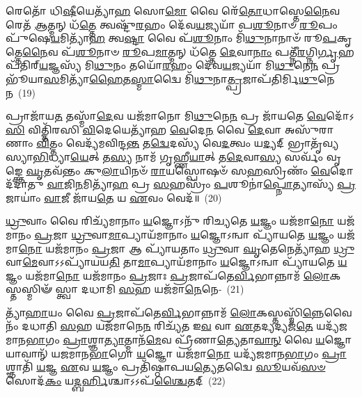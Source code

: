 𑌰𑍇𑌤𑍋᳴ 𑌧𑌿\-\ul{𑌷𑍀}\-𑌯𑍇𑌤𑍍𑌯𑌾᳴\-\ul{𑌹} 𑌸𑍋\-\ul{𑌮𑍋} 𑌵𑍈 𑌰𑍇᳴\-\ul{𑌤𑍋}\-𑌧𑌾𑌸𑍍𑌤𑍇\-\ul{𑌨𑍈}\-𑌵 𑌰𑍇𑌤᳴ \ul{𑌆}\-𑌤𑍍𑌮𑌨𑍍 𑌧᳴\-\ul{𑌤𑍍𑌤𑍇} 𑌤𑍍𑌵𑌷𑍍𑌟𑍁᳴\-\ul{𑌰}\-𑌹𑌂 𑌦𑍇᳴𑌵\-\ul{𑌯}\-𑌜𑍍𑌯𑌯𑌾᳴ 𑌪\-\ul{𑌶𑍂}\-𑌨𑌾𑍞 \ul{𑌰𑍂}\-𑌪𑌂 𑌪𑍁᳴𑌷𑍇\-\ul{𑌯}\-𑌮𑌿𑌤𑍍𑌯𑌾᳴\-\ul{𑌹} 𑌤𑍍𑌵\-\ul{𑌷𑍍𑌟𑌾} 𑌵𑍈 𑌪᳴\-\ul{𑌶𑍂}\-𑌨𑌾𑌂 𑌮𑌿᳴\-\ul{𑌥𑍁}\-𑌨𑌾𑌨𑌾𑍞᳴ 𑌰𑍂\-\ul{𑌪}\-𑌕𑍃𑌤𑍍𑌤𑍇\-\ul{𑌨𑍈}\-𑌵 𑌪᳴\-\ul{𑌶𑍂}\-𑌨𑌾𑍞 \ul{𑌰𑍂}\-𑌪\-\ul{𑌮𑌾}\-𑌤𑍍𑌮𑌨𑍍 𑌧᳴𑌤𑍍𑌤𑍇 \ul{𑌦𑍇}\-𑌵𑌾\-\ul{𑌨𑌾𑌂} 𑌪𑌤𑍍𑌨𑍀᳴\-\ul{𑌰}\-𑌗𑍍𑌨𑌿\-\ul{𑌰𑍍𑌗𑍃}\-𑌹𑌪᳴𑌤𑌿𑌰𑍍‌\-\ul{𑌯}\-𑌜𑍍𑌞𑌸𑍍𑌯᳴ 𑌮𑌿\-\ul{𑌥𑍁}\-𑌨𑌂 𑌤𑌯𑍋᳴\-\ul{𑌰}\-𑌹𑌂 𑌦𑍇᳴𑌵\-\ul{𑌯}\-𑌜𑍍𑌯𑌯𑌾᳴ 𑌮𑌿\-\ul{𑌥𑍁}\-𑌨𑍇\-\ul{𑌨} 𑌪𑍍𑌰 𑌭𑍂᳴𑌯𑌾\-\ul{𑌸}\-𑌮𑌿𑌤𑍍𑌯𑌾᳴\-\ul{𑌹𑍈}\-𑌤\-\ul{𑌸𑍍𑌮𑌾}\-𑌦𑍍𑌵𑍈 𑌮𑌿᳴\-\ul{𑌥𑍁}\-𑌨𑌾\-\ul{𑌤𑍍𑌪𑍍𑌰}\-𑌜𑌾𑌪᳴𑌤𑌿𑌰𑍍𑌮𑌿\-\ul{𑌥𑍁}\-𑌨𑍇\-\ul{𑌨}\-~(19)

𑌪𑍍𑌰𑌾𑌜𑌾᳴𑌯\-\ul{𑌤} 𑌤𑌸𑍍𑌮𑌾᳴\-\ul{𑌦𑍇}\-𑌵 𑌯𑌜᳴𑌮𑌾𑌨𑍋 𑌮𑌿\-\ul{𑌥𑍁}\-𑌨𑍇\-\ul{𑌨} 𑌪𑍍𑌰 𑌜𑌾᳴𑌯𑌤𑍇 \ul{𑌵𑍇}\-𑌦𑍋᳴\-𑌽\-\ul{𑌸𑌿} 𑌵𑌿𑌤𑍍𑌤𑌿᳴𑌰𑌸𑌿 \ul{𑌵𑌿}\-𑌦𑍇𑌯𑍇𑌤𑍍𑌯𑌾᳴𑌹 \ul{𑌵𑍇}\-𑌦𑍇\-\ul{𑌨} 𑌵𑍈 \ul{𑌦𑍇}\-𑌵𑌾 𑌅𑌸𑍁᳴𑌰𑌾𑌣𑌾𑌂 \ul{𑌵𑌿}\-𑌤𑍍𑌤𑌂 𑌵𑍇𑌦𑍍𑌯᳴𑌮𑌵𑌿𑌨𑍍𑌦\-\ul{𑌨𑍍𑌤} 𑌤\-\ul{𑌦𑍍𑌵𑍇}\-𑌦𑌸𑍍𑌯᳴ 𑌵𑍇\-\ul{𑌦}\-𑌤𑍍𑌵𑌂 𑌯\-\ul{𑌦𑍍𑌯}\-𑌦𑍍 𑌭𑍍𑌰𑌾𑌤𑍃᳴𑌵𑍍𑌯𑌸𑍍𑌯𑌾\-\ul{𑌭𑌿}\-𑌧𑍍𑌯𑌾\-\ul{𑌯𑍇}\-𑌤𑍍 𑌤\-\ul{𑌸𑍍𑌯} 𑌨𑌾𑌮᳴ 𑌗𑍃𑌹𑍍𑌣𑍀\-\ul{𑌯𑌾}\-𑌤𑍍 𑌤\-\ul{𑌦𑍇}\-𑌵𑌾\-\ul{𑌸𑍍𑌯} 𑌸𑌰𑍍𑌵𑌂᳴ 𑌵𑍃𑌙𑍍𑌕𑍍𑌤𑍇 \ul{𑌘𑍃}\-𑌤𑌵᳴𑌨𑍍𑌤𑌂 𑌕𑍁\-\ul{𑌲𑌾}\-𑌯𑌿𑌨𑍞᳴ \ul{𑌰𑌾}\-𑌯𑌸𑍍𑌪𑍋𑌷𑍞᳴ 𑌸\-\ul{𑌹}\-𑌸𑍍𑌰𑌿𑌣𑌂᳴ \ul{𑌵𑍇}\-𑌦𑍋 𑌦᳴𑌦𑌾𑌤𑍁 \ul{𑌵𑌾}\-𑌜𑌿\-\ul{𑌨}\-𑌮𑌿𑌤𑍍𑌯𑌾᳴\-\ul{𑌹} 𑌪𑍍𑌰 \ul{𑌸}\-𑌹𑌸𑍍𑌰𑌂᳴ \ul{𑌪}\-𑌶𑍂𑌨𑌾॑\-\ul{𑌪𑍍𑌨𑍋}\-𑌤𑍍𑌯𑌾𑌸𑍍𑌯᳴ \ul{𑌪𑍍𑌰}\-𑌜𑌾𑌯𑌾𑌂॑ \ul{𑌵𑌾}\-𑌜𑍀 𑌜𑌾᳴𑌯\-\ul{𑌤𑍇} 𑌯 \ul{𑌏}\-𑌵𑌂 𑌵𑍇𑌦᳴॥~(20)

{\anuvakamend[{\-\ul{𑌦}\-\-\ul{𑌰𑍍}\-\mbox{}\-\ul{𑌶}\-\-\ul{𑌪𑍂}\-\-\ul{𑌰𑍍𑌣}\-\-\ul{𑌮𑌾}\-𑌸𑌯𑍋᳴𑌰𑍁\-\ul{𑌭}\-𑌯𑌤𑍋᳴ 𑌦𑍇\-\ul{𑌵𑌾}\-𑌶𑍍𑌵𑌾𑌃 \ul{𑌸𑍁}\-𑌰𑍇𑌤𑌾𑌃॑ \ul{𑌪𑍍𑌰}\-𑌜𑌾𑌪᳴𑌤𑌿𑌰𑍍𑌮𑌿\-\ul{𑌥𑍁}\-𑌨𑍇𑌨𑌾॑\-𑌽\-𑌽𑌪𑍍𑌨𑍋\-\ul{𑌤𑍍𑌯}\-𑌷𑍍𑌟𑍗 𑌚᳴}]}%

\-\ul{𑌧𑍍𑌰𑍁}\-𑌵𑌾𑌂 𑌵𑍈 𑌰𑌿𑌚𑍍𑌯᳴𑌮𑌾𑌨𑌾𑌂 \ul{𑌯}\-𑌜𑍍𑌞𑍋\-𑌽𑌨𑍁᳴ 𑌰𑌿𑌚𑍍𑌯𑌤𑍇 \ul{𑌯}\-𑌜𑍍𑌞𑌂 𑌯𑌜᳴𑌮𑌾\-\ul{𑌨𑍋} 𑌯𑌜᳴𑌮𑌾𑌨𑌂 \ul{𑌪𑍍𑌰}\-𑌜𑌾 \ul{𑌧𑍍𑌰𑍁}\-𑌵𑌾\-\ul{𑌮𑌾}\-𑌪𑍍𑌯𑌾𑌯᳴𑌮𑌾𑌨𑌾𑌂 \ul{𑌯}\-𑌜𑍍𑌞𑍋\-𑌽𑌨𑍍𑌵𑌾 𑌪𑍍𑌯𑌾᳴𑌯𑌤𑍇 \ul{𑌯}\-𑌜𑍍𑌞𑌂 𑌯𑌜᳴𑌮𑌾\-\ul{𑌨𑍋} 𑌯𑌜᳴𑌮𑌾𑌨𑌂 \ul{𑌪𑍍𑌰}\-𑌜𑌾 𑌆 𑌪𑍍𑌯𑌾᳴𑌯𑌤𑌾𑌂 \ul{𑌧𑍍𑌰𑍁}\-𑌵𑌾 \ul{𑌘𑍃}\-𑌤𑍇𑌨𑍇𑌤𑍍𑌯𑌾᳴𑌹 \ul{𑌧𑍍𑌰𑍁}\-𑌵𑌾\-\ul{𑌮𑍇}\-𑌵𑌾\-𑌽\-𑌽𑌪𑍍𑌯𑌾᳴𑌯𑌯\-\ul{𑌤𑌿} 𑌤𑌾\-\ul{𑌮𑌾}\-𑌪𑍍𑌯𑌾𑌯᳴𑌮𑌾𑌨𑌾𑌂 \ul{𑌯}\-𑌜𑍍𑌞𑍋\-𑌽𑌨𑍍𑌵𑌾 𑌪𑍍𑌯𑌾᳴𑌯𑌤𑍇 \ul{𑌯}\-𑌜𑍍𑌞𑌂 𑌯𑌜᳴𑌮𑌾\-\ul{𑌨𑍋} 𑌯𑌜᳴𑌮𑌾𑌨𑌂 \ul{𑌪𑍍𑌰}\-𑌜𑌾𑌃 \ul{𑌪𑍍𑌰}\-𑌜𑌾𑌪᳴𑌤𑍇\-\ul{𑌰𑍍𑌵𑌿}\-𑌭𑌾𑌨𑍍𑌨𑌾𑌮᳴ \ul{𑌲𑍋}\-𑌕𑌸𑍍𑌤𑌸𑍍𑌮𑌿𑍟᳴ 𑌸𑍍𑌤𑍍𑌵𑌾 𑌦𑌧𑌾𑌮𑌿 \ul{𑌸}\-𑌹 𑌯𑌜᳴𑌮𑌾\-\ul{𑌨𑍇}\-𑌨𑍇-~(21)

𑌤𑍍𑌯𑌾᳴\-\ul{𑌹𑌾}\-𑌯𑌂 𑌵𑍈 \ul{𑌪𑍍𑌰}\-𑌜𑌾𑌪᳴𑌤𑍇\-\ul{𑌰𑍍𑌵𑌿}\-𑌭𑌾𑌨𑍍𑌨𑌾𑌮᳴ \ul{𑌲𑍋}\-𑌕𑌸𑍍𑌤𑌸𑍍𑌮𑌿᳴\-\ul{𑌨𑍍𑌨𑍇}\-𑌵𑍈𑌨𑌂᳴ 𑌦𑌧𑌾𑌤𑌿 \ul{𑌸}\-𑌹 𑌯𑌜᳴𑌮𑌾𑌨𑍇\-\ul{𑌨} 𑌰𑌿𑌚𑍍𑌯᳴𑌤 𑌇\-\ul{𑌵} 𑌵𑌾 \ul{𑌏}\-𑌤𑌦𑍍𑌯𑌦𑍍𑌯𑌜᳴\-\ul{𑌤𑍇} 𑌯𑌦𑍍𑌯᳴𑌜𑌮𑌾𑌨\-\ul{𑌭𑌾}\-𑌗𑌂 \ul{𑌪𑍍𑌰𑌾}\-𑌶𑍍𑌞𑌾\-\ul{𑌤𑍍𑌯𑌾}\-𑌤𑍍𑌮𑌾𑌨᳴\-\ul{𑌮𑍇}\-𑌵 𑌪𑍍𑌰𑍀᳴𑌣𑌾\-\ul{𑌤𑍍𑌯𑍇}\-𑌤𑌾\-\ul{𑌵𑌾}\-\-\ul{𑌨𑍍} 𑌵𑍈 \ul{𑌯}\-𑌜𑍍𑌞𑍋 𑌯𑌾𑌵𑌾𑌨𑍍᳴ 𑌯𑌜𑌮𑌾𑌨\-\ul{𑌭𑌾}\-𑌗𑍋 \ul{𑌯}\-𑌜𑍍𑌞𑍋 𑌯𑌜᳴𑌮𑌾\-\ul{𑌨𑍋} 𑌯𑌦𑍍𑌯᳴𑌜𑌮𑌾𑌨\-\ul{𑌭𑌾}\-𑌗𑌂 \ul{𑌪𑍍𑌰𑌾}\-𑌶𑍍𑌞𑌾𑌤𑌿᳴ \ul{𑌯}\-𑌜𑍍𑌞 \ul{𑌏}\-𑌵 \ul{𑌯}\-𑌜𑍍𑌞𑌂 𑌪𑍍𑌰𑌤𑌿᳴𑌷𑍍𑌠𑌾𑌪𑌯\-\ul{𑌤𑍍𑌯𑍇}\-𑌤𑌦𑍍𑌵𑍈 \ul{𑌸𑍂}\-𑌯𑌵᳴\-\ul{𑌸}\-\-\ul{𑍞} 𑌸𑍋𑌦᳴\-\ul{𑌕𑌂} 𑌯\-\ul{𑌦𑍍𑌬}\-\-\ul{𑌰𑍍}\-\mbox{}𑌹𑌿𑌶𑍍𑌚𑌾\-𑌽\-𑌽𑌪᳴\-\ul{𑌶𑍍𑌚𑍈}\-𑌤𑌦𑍍~(22)

